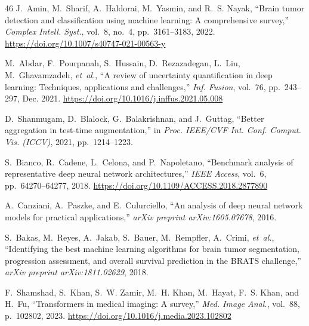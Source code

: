 \documentclass[journal]{IEEEtran}
\providecommand{\doi}[1]{\url{https://doi.org/#1}}
\begin{document}
\begin{thebibliography}{46}
J.~Amin, M.~Sharif, A.~Haldorai, M.~Yasmin, and R.~S. Nayak, ``Brain tumor detection and classification using machine learning: A comprehensive survey,'' \emph{Complex Intell. Syst.}, vol.~8, no.~4, pp.~3161--3183, 2022. \doi{10.1007/s40747-021-00563-y}

M.~Abdar, F.~Pourpanah, S.~Hussain, D.~Rezazadegan, L.~Liu, M.~Ghavamzadeh, \emph{et~al.}, ``A review of uncertainty quantification in deep learning: Techniques, applications and challenges,'' \emph{Inf. Fusion}, vol.~76, pp.~243--297, Dec. 2021. \doi{10.1016/j.inffus.2021.05.008}

D.~Shanmugam, D.~Blalock, G.~Balakrishnan, and J.~Guttag, ``Better aggregation in test-time augmentation,'' in \emph{Proc. IEEE/CVF Int. Conf. Comput. Vis. (ICCV)}, 2021, pp.~1214--1223.

S.~Bianco, R.~Cadene, L.~Celona, and P.~Napoletano, ``Benchmark analysis of representative deep neural network architectures,'' \emph{IEEE Access}, vol.~6, pp.~64270--64277, 2018. \doi{10.1109/ACCESS.2018.2877890}

A.~Canziani, A.~Paszke, and E.~Culurciello, ``An analysis of deep neural network models for practical applications,'' \emph{arXiv preprint arXiv:1605.07678}, 2016.

S.~Bakas, M.~Reyes, A.~Jakab, S.~Bauer, M.~Rempfler, A.~Crimi, \emph{et~al.}, ``Identifying the best machine learning algorithms for brain tumor segmentation, progression assessment, and overall survival prediction in the BRATS challenge,'' \emph{arXiv preprint arXiv:1811.02629}, 2018.

F.~Shamshad, S.~Khan, S.~W. Zamir, M.~H. Khan, M.~Hayat, F.~S. Khan, and H.~Fu, ``Transformers in medical imaging: A survey,'' \emph{Med. Image Anal.}, vol.~88, p.~102802, 2023. \doi{10.1016/j.media.2023.102802}

\end{thebibliography}

\end{document}

